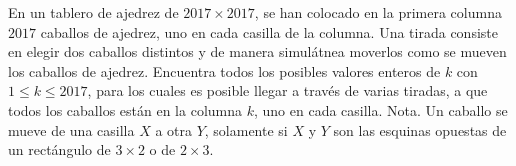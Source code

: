 \documentclass[11pt]{scrartcl}
\begin{document}
\begin{problema} [OMM 2017/1]
    
    En un tablero de ajedrez de $2017 \times 2017$, se han colocado en la primera columna $2017$
caballos de ajedrez, uno en cada casilla de la columna. Una tirada consiste en elegir dos
caballos distintos y de manera simulátnea moverlos como se mueven los caballos de ajedrez.
Encuentra todos los posibles valores enteros de $k$ con $1 \leq k \leq 2017$, para los cuales es
posible llegar a través de varias tiradas, a que todos los caballos están en la columna $k$, uno
en cada casilla.
Nota. Un caballo se mueve de una casilla $X$ a otra $Y$, solamente si $X$ y $Y$ son las esquinas
opuestas de un rectángulo de $3 \times 2$ o de $2 \times 3$.
    
\end{problema}

\printindex[topic]
\end{document}
